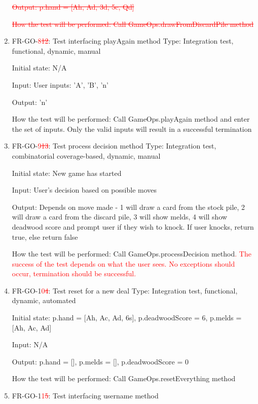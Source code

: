 \documentclass[12pt, titlepage]{article}
\begin{document}
\begin{enumerate}
    \textcolor{red}{\sout{Output: p.hand = [Ah, Ad, 3d, 5c, Qd]}}
    
    \textcolor{red}{\sout{How the test will be performed: Call GameOps.drawFromDiscardPile method}}
    
    \item{FR-GO-\textcolor{red}{8\sout{12}}: Test interfacing playAgain method}
    Type: Integration test, functional, dynamic, manual
    
    Initial state: N/A
    
    Input: User inputs: 'A', 'B', 'n'
    
    Output: 'n'
    
    How the test will be performed: Call GameOps.playAgain method and enter the set of inputs. Only the valid inputs will result in a successful termination
    
    \item{FR-GO-\textcolor{red}{9\sout{13}}: Test process decision method}
    Type: Integration test, combinatorial coverage-based, dynamic, manual
    
    Initial state: New game has started
    
    Input: User's decision based on possible moves
    
    Output: Depends on move made - 1 will draw a card from the stock pile, 2 will draw a card from the discard pile, 3 will show melds, 4 will show deadwood score and prompt user if they wish to knock. If user knocks, return true, else return false
    
    How the test will be performed: Call GameOps.processDecision method\textcolor{red}{. The success of the test depends on what the user sees. No exceptions should occur, termination should be successful.}
    
    \item{FR-GO-1\textcolor{red}{0\sout{4}}: Test reset for a new deal}
    Type: Integration test, functional, dynamic, automated
    
    Initial state: p.hand = [Ah, Ac, Ad, 6s], p.deadwoodScore = 6, p.melds = [Ah, Ac, Ad]
    
    Input: N/A
    
    Output: p.hand = [], p.melds = [], p.deadwoodScore = 0
    
    How the test will be performed: Call GameOps.resetEverything method
    
    \item{FR-GO-1\textcolor{red}{1\sout{5}}: Test interfacing username method}
    

\end{enumerate}
\end{document}
